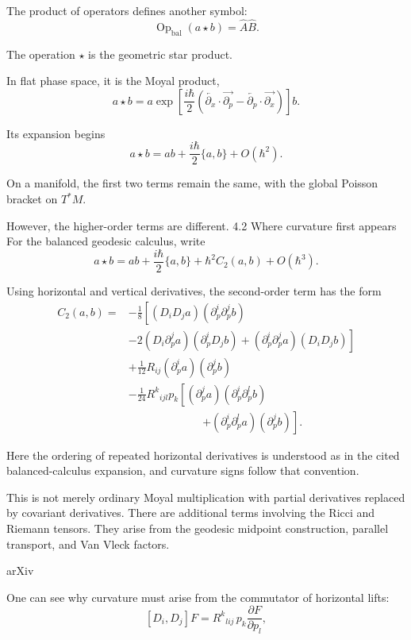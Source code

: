 The product of operators defines another symbol:
\[
\operatorname{Op}_{\mathrm{bal}}(a\star b)
=
\widehat A\widehat B.
\tag{36}
\]

The operation \(\star\) is the geometric star product.

In flat phase space, it is the Moyal product,
\[
a\star b
=
a\exp\left[
\frac{i\hbar}{2}
\left(
\overleftarrow{\partial_x}\cdot
\overrightarrow{\partial_p}
-
\overleftarrow{\partial_p}\cdot
\overrightarrow{\partial_x}
\right)
\right]b.
\tag{37}
\]

Its expansion begins
\[
a\star b
=
ab+\frac{i\hbar}{2}\{a,b\}
+O(\hbar^2).
\tag{38}
\]

On a manifold, the first two terms remain the same, with the global Poisson bracket on \(T^*M\).

However, the higher-order terms are different.
4.2 Where curvature first appears
For the balanced geodesic calculus, write
\[
a\star b
=
ab+\frac{i\hbar}{2}\{a,b\}
+\hbar^2 C_2(a,b)+O(\hbar^3).
\tag{39}
\]

Using horizontal and vertical derivatives, the second-order term has the form
\[
\begin{aligned}
C_2(a,b)={}&
-\frac18\left[
(D_iD_ja)(\partial_p^i\partial_p^jb)
\right.\\
&\left.
-2(D_i\partial_p^ja)
  (\partial_p^iD_jb)
+(\partial_p^i\partial_p^ja)(D_iD_jb)
\right]\\
&+\frac1{12}R_{ij}
(\partial_p^ia)(\partial_p^jb)\\
&-\frac1{24}R^k{}_{ijl}p_k
\left[
(\partial_p^ja)(\partial_p^i\partial_p^lb)
\right.\\
&\hspace{80pt}\left.
+(\partial_p^i\partial_p^la)(\partial_p^jb)
\right].
\end{aligned}
\tag{40}
\]

Here the ordering of repeated horizontal derivatives is understood as in the cited balanced-calculus expansion, and curvature signs follow that convention.

This is not merely ordinary Moyal multiplication with partial derivatives replaced by covariant derivatives. There are additional terms involving the Ricci and Riemann tensors. They arise from the geodesic midpoint construction, parallel transport, and Van Vleck factors. 

arXiv




One can see why curvature must arise from the commutator of horizontal lifts:
\[
[D_i,D_j]F
=
R^k{}_{l ij}\,p_k
\frac{\partial F}{\partial p_l},
\tag{41}
\]

